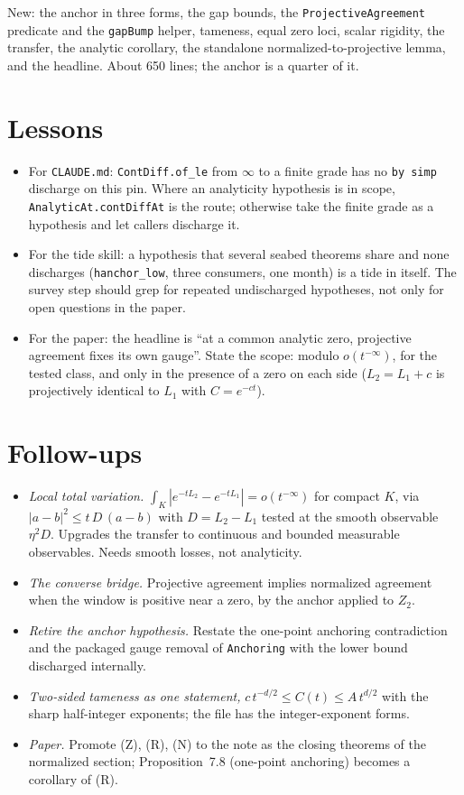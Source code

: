 \documentclass[11pt]{article}
\newcommand{\code}[1]{\texttt{#1}}
\begin{document}
New: the anchor in three forms, the gap bounds, the
\code{ProjectiveAgreement} predicate and the \code{gapBump} helper,
tameness, equal zero loci, scalar rigidity, the transfer, the analytic
corollary, the standalone normalized-to-projective lemma, and the
headline. About 650 lines; the anchor is a quarter of it.

\section{Lessons}

\begin{itemize}
\item For \code{CLAUDE.md}: \code{ContDiff.of\_le} from $\infty$ to a
finite grade has no \code{by simp} discharge on this pin. Where an
analyticity hypothesis is in scope, \code{AnalyticAt.contDiffAt} is the
route; otherwise take the finite grade as a hypothesis and let callers
discharge it.
\item For the tide skill: a hypothesis that several seabed theorems
share and none discharges (\code{hanchor\_low}, three consumers, one
month) is a tide in itself. The survey step should grep for repeated
undischarged hypotheses, not only for open questions in the paper.
\item For the paper: the headline is ``at a common analytic zero,
projective agreement fixes its own gauge''. State the scope: modulo
$o(t^{-\infty})$, for the tested class, and only in the presence of a
zero on each side ($L_2 = L_1 + c$ is projectively identical to $L_1$
with $C = e^{-ct}$).
\end{itemize}

\section{Follow-ups}

\begin{itemize}
\item \emph{Local total variation.} $\int_K|e^{-tL_2} - e^{-tL_1}| =
o(t^{-\infty})$ for compact $K$, via $|a - b|^2 \le t\,D\,(a - b)$ with
$D = L_2 - L_1$ tested at the smooth observable $\eta^2 D$. Upgrades the
transfer to continuous and bounded measurable observables. Needs smooth
losses, not analyticity.
\item \emph{The converse bridge.} Projective agreement implies
normalized agreement when the window is positive near a zero, by the
anchor applied to $Z_2$.
\item \emph{Retire the anchor hypothesis.} Restate the one-point
anchoring contradiction and the packaged gauge removal of
\code{Anchoring} with the lower bound discharged internally.
\item \emph{Two-sided tameness as one statement,} $c\,t^{-d/2} \le C(t)
\le A\,t^{d/2}$ with the sharp half-integer exponents; the file has the
integer-exponent forms.
\item \emph{Paper.} Promote (Z), (R), (N) to the note as the closing
theorems of the normalized section; Proposition~7.8 (one-point
anchoring) becomes a corollary of (R).
\end{itemize}
\end{document}
